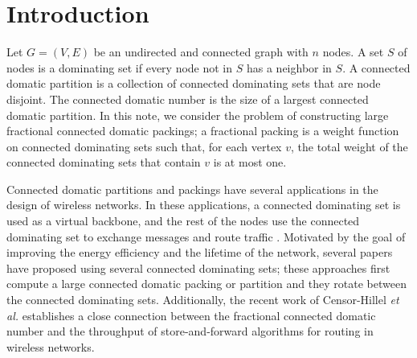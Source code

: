 \documentclass[11pt]{article}
\def\etal{\emph{et al.}\xspace}
\begin{document}
\newpage
\setcounter{page}{1}

\section{Introduction}
\label{sec:intro}

Let $G = (V, E)$ be an undirected and connected graph with $n$ nodes.
A set $S$ of nodes is a dominating set if every node not in $S$ has a
neighbor in $S$. A connected domatic partition is a collection of
connected dominating sets that are node disjoint. The connected
domatic number is the size of a largest connected domatic partition.
In this note, we consider the problem of constructing large
fractional connected domatic packings; a fractional packing is a
weight function on connected dominating sets such that, for each
vertex $v$, the total weight of the connected dominating sets that
contain $v$ is at most one.

Connected domatic partitions and packings have several applications
in the design of wireless networks. In these applications, a
connected dominating set is used as a virtual backbone, and the rest
of the nodes use the connected dominating set to exchange messages
and route traffic \cite{DasB97,DasSB97,MahjoubM10}.  Motivated by the
goal of improving the energy efficiency and the lifetime of the
network, several papers \cite{MisraM09,MoscibrodaW05,PemmarajuP06}
have proposed using several connected dominating sets; these
approaches first compute a large connected domatic packing or
partition and they rotate between the connected dominating sets.
Additionally, the recent work of Censor-Hillel \etal \cite{CHGK}
establishes a close connection between the fractional connected
domatic number and the throughput of store-and-forward algorithms for
routing in wireless networks.
\end{document}
